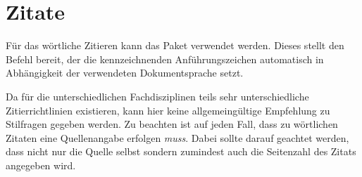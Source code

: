 \documentclass[%
  english,ngerman,%
  geometry=no,DIV=12,automark,%
]{tudscrartcl}
\begin{document}
\section{Zitate}
Für das wörtliche Zitieren kann das Paket  verwendet werden. 
Dieses stellt den Befehl  bereit, der die kennzeichnenden 
Anführungszeichen automatisch in Abhängigkeit der verwendeten Dokumentsprache 
setzt. 
%
\begin{Hint}
\usepackage{csquotes}
\end{Hint}
%
Da für die unterschiedlichen Fachdisziplinen teils sehr unterschiedliche 
Zitierrichtlinien existieren, kann hier keine allgemeingültige Empfehlung zu 
Stilfragen gegeben werden. Zu beachten ist auf jeden Fall, dass zu wörtlichen 
Zitaten eine Quellenangabe erfolgen \emph{muss}. Dabei sollte darauf geachtet 
werden, dass nicht nur die Quelle selbst sondern zumindest auch die Seitenzahl 
des Zitats angegeben wird.
%
\end{document}

